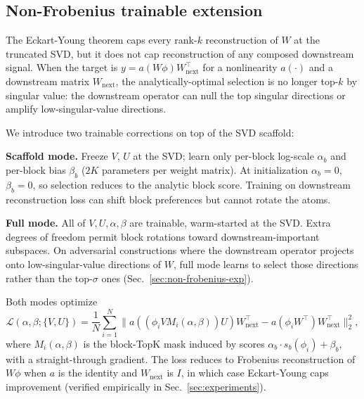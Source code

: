 \subsection{Non-Frobenius trainable extension}
\label{sec:non-frobenius}

The Eckart-Young theorem caps every rank-$k$ reconstruction of $W$ at the truncated SVD, but it does not cap reconstruction of any composed downstream signal. When the target is $y = a(W\phi) W_\text{next}^\top$ for a nonlinearity $a(\cdot)$ and a downstream matrix $W_\text{next}$, the analytically-optimal selection is no longer top-$k$ by singular value: the downstream operator can null the top singular directions or amplify low-singular-value directions.

We introduce two trainable corrections on top of the SVD scaffold:

\textbf{Scaffold mode.} Freeze $V$, $U$ at the SVD; learn only per-block log-scale $\alpha_b$ and per-block bias $\beta_b$ ($2K$ parameters per weight matrix). At initialization $\alpha_b = 0$, $\beta_b = 0$, so selection reduces to the analytic block score. Training on downstream reconstruction loss can shift block preferences but cannot rotate the atoms.

\textbf{Full mode.} All of $V, U, \alpha, \beta$ are trainable, warm-started at the SVD. Extra degrees of freedom permit block rotations toward downstream-important subspaces. On adversarial constructions where the downstream operator projects onto low-singular-value directions of $W$, full mode learns to select those directions rather than the top-$\sigma$ ones (Sec.\ \ref{sec:non-frobenius-exp}).

Both modes optimize
\begin{equation}
\mathcal{L}(\alpha, \beta; \{V, U\})
= \frac{1}{N} \sum_{i=1}^{N} \|a((\phi_i V M_{i}(\alpha, \beta))U) W_\text{next}^\top - a(\phi_i W^\top) W_\text{next}^\top\|_2^2,
\label{eq:non-frob-loss}
\end{equation}
where $M_i(\alpha, \beta)$ is the block-TopK mask induced by scores $\alpha_b \cdot s_b(\phi_i) + \beta_b$, with a straight-through gradient. The loss reduces to Frobenius reconstruction of $W\phi$ when $a$ is the identity and $W_\text{next}$ is $I$, in which case Eckart-Young caps improvement (verified empirically in Sec.\ \ref{sec:experiments}).
